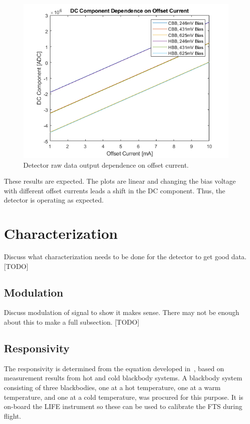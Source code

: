\begin{figure}[h]
  \includegraphics[width=\linewidth]{chap6_images/verification/dc_component_dependence_on_offset_current.png}
  \caption{Detector raw data output dependence on offset current.}
  \label{fig:dc_dep_on_offset}
\end{figure}

These results are expected. The plots are linear and changing the bias voltage with different offset currents leads a shift in the DC component. Thus, the detector is operating as expected.

\section{Characterization}
Discuss what characterization needs to be done for the detector to get good data.
[TODO]

\subsection{Modulation}
Discuss modulation of signal to show it makes sense. There may not be enough about this to make a full subsection.
[TODO]

\subsection{Responsivity}
The responsivity is determined from the equation developed in~\cite{GLORIA_PhD}, based on measurement results from hot and cold blackbody systems. A blackbody system consisting of three blackbodies, one at a hot temperature, one at a warm temperature, and one at a cold temperature, was procured for this purpose. It is on-board the LIFE instrument so these can be used to calibrate the FTS during flight.

